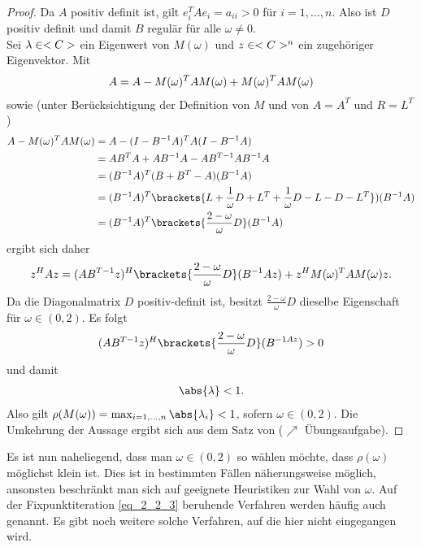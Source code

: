 \begin{proof}
	Da $A$ positiv definit ist, gilt $e_i^TA e_i = a_{ii} > 0$ für $i = 1, \dots, n$. Also ist $D$ positiv definit und damit $B$ regulär für alle $\omega \neq 0$.\\
	Sei $\lambda \in <C>$ ein Eigenwert von $M(\omega)$ und $z \in <C>^n$ ein zugehöriger Eigenvektor. Mit
	\begin{align}
		A = A - M(\omega)^T AM(\omega) + M(\omega)^T AM(\omega) \notag
	\end{align}
	sowie (unter Berücksichtigung der Definition von $M$ und von $A = A^T$ und $R = L^T$)
	\begin{align}
	A - M(\omega)^T AM(\omega) 
	&= A - (I - B^{-1}A)^T A(I-B^{-1}A)\notag\\
	&= AB^T A + AB^{-1}A - AB^{T-1}AB^{-1}A\notag\\
	&= (B^{-1}A)^T (B + B^T - A)(B^{-1}A)\notag\\
	&= (B^{-1}A)^T \brackets{L + \frac{1}{\omega}D + L^T + \frac{1}{\omega}D - L - D - L^T})(B^{-1}A)\notag\\
	&= (B^{-1}A)^T\brackets{\frac{2 -\omega}{\omega}D}(B^{-1}A)\notag
	\end{align}
	ergibt sich daher
	\begin{align}
		z^H Az = (AB^{T-1}z)^H\brackets{\frac{2 -\omega}{\omega}D}(B^{-1}Az) + z^H M(\omega)^T AM(\omega)z.\notag
	\end{align}
	Da die Diagonalmatrix $D$ positiv-definit ist, besitzt $\frac{2-\omega}{\omega}D$ dieselbe Eigenschaft für $\omega \in (0,2)$. Es folgt
	\begin{align}
		(AB^{T-1}z)^H \brackets{\frac{2 -\omega}{\omega}D} (B^{-1 Az}) > 0 \notag
	\end{align}
	und damit
	\begin{align}
		\abs{\lambda} < 1.
	\end{align}
	Also gilt $\rho(M(\omega)) = \max_{i = 1,\dots,n}\abs{\lambda_i} < 1$, sofern $\omega \in (0,2)$. Die Umkehrung der Aussage ergibt sich aus dem Satz von  ($\nearrow$ Übungsaufgabe). %
\end{proof}

Es ist nun naheliegend, dass man $\omega \in(0,2)$ so wählen möchte, dass $\rho(\omega)$ möglichst klein ist. Dies ist in bestimmten Fällen näherungsweise möglich, ansonsten beschränkt man sich auf geeignete Heuristiken zur Wahl von $\omega$. Auf der Fixpunktiteration \cref{eq_2_2_3} beruhende Verfahren werden häufig auch  genannt. Es gibt noch weitere solche Verfahren, auf die hier nicht eingegangen wird.